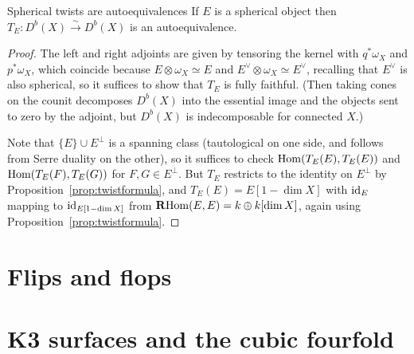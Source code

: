 \begin{proposition}{Spherical twists are autoequivalences}{}
    If $E$ is a spherical object then $T_E:D^b(X)\xrightarrow\sim D^b(X)$ is an
    autoequivalence.
\end{proposition}

\begin{proof}
    The left and right adjoints are given by tensoring the kernel with
    $q^*\omega_X$ and $p^*\omega_X$, which coincide because
    $E\otimes\omega_X\simeq E$ and $E^\vee\otimes\omega_X\simeq E^\vee$,
    recalling that $E^\vee$ is also spherical, so it suffices to show that
    $T_E$ is fully faithful. (Then taking cones on the counit decomposes
    $D^b(X)$ into the essential image and the objects sent to zero by the
    adjoint, but $D^b(X)$ is indecomposable for connected $X$.)

    Note that $\{E\}\cup E^\perp$ is a spanning class (tautological on one side,
    and follows from Serre duality on the other), so it suffices to check
    $\operatorname{Hom}(T_E(E),T_E(E))$ and $\operatorname{Hom}(T_E(F),T_E(G))$ for $F,G\in E^\perp$. But
    $T_E$ restricts to the identity on $E^\perp$ by
    Proposition~\ref{prop:twistformula}, and $T_E(E)=E[1-\dim X]$ with $\mathrm{id}_E$
    mapping to $\mathrm{id}_{E[1-\dim X]}$ from $\operatorname{\mathbf{R}Hom}(E,E)=k\oplus k[\dim X]$, again
    using Proposition~\ref{prop:twistformula}.
\end{proof}


\section{Flips and flops}


\section{K3 surfaces and the cubic fourfold}

